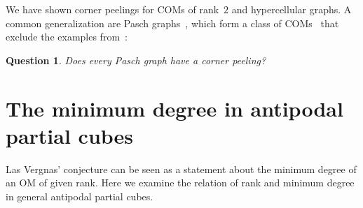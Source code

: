 \documentclass[final,11pt]{article}
\newtheorem{prop}[thm]{Proposition}%
\newtheorem{quest}{Question}
\newcommand{\TODO}[1]{\emph{\textcolor{red}{#1}}}
\begin{document}
%

We have shown corner peelings for COMs of rank~$2$ and hypercellular graphs. A common generalization are Pasch graphs~\cite{Che-94,Che-16}, which form a class of COMs~\cite{Kna-17} that exclude the examples from~\cite{Cha-18,Tra-04,Ban-96}:
\begin{quest}\label{quest:pasch}
 Does every Pasch graph have a corner peeling?
\end{quest}


\section{The minimum degree in antipodal partial cubes}\label{sec:antipodal}
Las Vergnas' conjecture can be seen as a statement about the minimum degree of an OM of given rank. Here we examine the relation of rank and minimum degree in general antipodal partial cubes.
\end{document}
